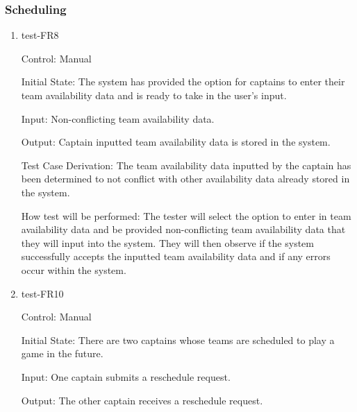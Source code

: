 \documentclass[12pt, titlepage]{article}
\begin{document}


\subsubsection{Scheduling}


\begin{enumerate}

  \item{test-FR8\\}

  Control: Manual
            
  Initial State: The system has provided the option for captains to enter their team
  availability data and is ready to take in the user's input.
            
  Input: Non-conflicting team availability data.
            
  Output: Captain inputted team availability data is stored in the system.

  Test Case Derivation: The team availability data inputted by the captain has been
  determined to not conflict with other availability data already stored in the system.
            
  How test will be performed: The tester will select the option to enter in team 
  availability data and be provided non-conflicting team availability
  data that they will input into the system. They will then observe if the system successfully
  accepts the inputted team availability data and if any errors occur within the system.

  \item{test-FR10\\}

  Control: Manual

  Initial State: There are two captains whose teams are scheduled to play a
  game in the future.
            
  Input: One captain submits a reschedule request.

  Output: The other captain receives a reschedule request.


\end{enumerate}
\end{document}

